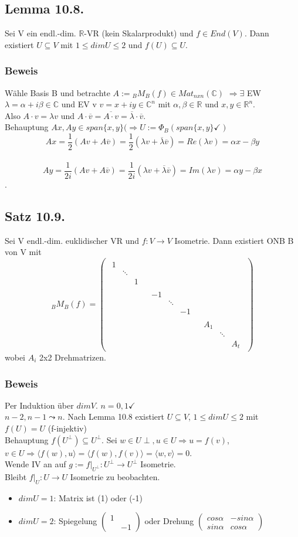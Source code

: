 \documentclass[a4paper, 12pt]{extarticle}
\newcommand{\twoXtwo}[4] {
	\left( 
	\begin{matrix}
		#1 & #2 \\
		#3 & #4
	\end{matrix} 
	\right)
}
\newcommand{\threeXthreeNoBracket}[9]{
	\begin{matrix}
		#1 & #2 & #3\\
		#4 & #5 & #6\\
		#7 & #8 & #9
	\end{matrix}
}
\newcommand{\threeXthree}[9] {
	\left( 
	\begin{matrix}
		#1 & #2 & #3\\
		#4 & #5 & #6\\
		#7 & #8 & #9
	\end{matrix}
	\right)
}
\newcommand{\skalar}[2] {
	\langle #1, #2\rangle
}
\begin{document}
\subsection*{Lemma 10.8.}
Sei V ein endl.-dim. $\mathbb R$-VR (kein Skalarprodukt) und $f\in End(V)$. Dann existiert $U\subseteq V$ mit $1\leq dim U \leq 2$ und $f(U)\subseteq U$.
\subsubsection*{Beweis}
Wähle Basis B und betrachte $A:= {}_BM_B(f) \in Mat_{nxn}(\mathbb C)$ $\Rightarrow \exists$ EW $\lambda = \alpha+i\beta \in \mathbb C$ und EV v $v= x+ iy \in \mathbb C^n$ mit $\alpha, \beta \in \mathbb R$ und $x,y \in \mathbb R^n$. \\
Also $A\cdot v = \lambda v$ und $A\cdot\overline v = \overline{A\cdot v} = \overline \lambda \cdot \overline v$. \\
Behauptung $Ax,Ay\in span\{x,y\} (\Rightarrow U:= \Phi_B(span\{x,y\}\checkmark)$ \\
$$Ax = \frac{1}{2}(Av+A\overline v) = \frac{1}{2}(\lambda v + \overline\lambda \overline v) = Re(\lambda v) = \alpha x - \beta y$$ \\
$$Ay = \frac{1}{2i}(Av+A\overline v) = \frac{1}{2i}(\lambda v + \overline\lambda \overline v) = Im(\lambda v) = \alpha y - \beta x$$.
\subsection*{Satz 10.9.}
Sei V endl.-dim. euklidischer VR und $f:V\to V$ Isometrie.
Dann existiert ONB B von V mit $${}_BM_B(f)= \threeXthree{\threeXthreeNoBracket{1}{ }{ }{ }{\ddots}{ }{ }{ }{1}}{ }{ }{ }{\threeXthreeNoBracket{-1}{ }{ }{ }{\ddots}{ }{ }{ }{-1}}{ }{ }{ }{\threeXthreeNoBracket{A_1}{ }{ }{ }{\ddots}{ }{ }{ }{A_t}}$$ wobei $A_i$ 2x2 Drehmatrizen.
\subsubsection*{Beweis} 
Per Induktion über $dimV$. $n=0,1\checkmark$\\
$n-2,n-1\leadsto n$. Nach Lemma 10.8 existiert $U\subseteq V$, $1\leq dimU\leq 2$ mit $f(U) = U$ (f-injektiv) \\
Behauptung $f(U^\perp) \subseteq U^\perp$. Sei $w\in U\perp, u\in U \Rightarrow u=f(v)$, $v\in U \Rightarrow \skalar{f(w)}{u} = \skalar{f(w)}{f(v)} = \skalar{w}{v} = 0$.\\
Wende IV an auf $g:=f|_{U^\perp}:U^\perp \to U^\perp$ Isometrie. \\
Bleibt $f|_U:U\to U$ Isometrie zu beobachten.
\begin{itemize}
	\item $dimU =1$: Matrix ist (1) oder (-1)
	\item $dimU =2$: Spiegelung $\twoXtwo{1}{ }{ }{-1}$ oder Drehung $\twoXtwo{cos\alpha}{-sin\alpha}{sin\alpha}{cos\alpha}$
\end{itemize}
\end{document}
